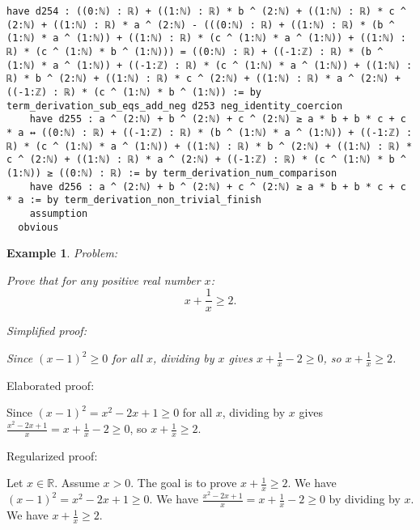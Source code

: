 \documentclass{article}
\newtheorem{example}{Example}
\begin{document}
\begin{tcolorbox}[colback=white!10, width=\linewidth]
\begin{lstlisting}[language=Lean4]
    have d254 : ((0:ℕ) : ℝ) + ((1:ℕ) : ℝ) * b ^ (2:ℕ) + ((1:ℕ) : ℝ) * c ^ (2:ℕ) + ((1:ℕ) : ℝ) * a ^ (2:ℕ) - (((0:ℕ) : ℝ) + ((1:ℕ) : ℝ) * (b ^ (1:ℕ) * a ^ (1:ℕ)) + ((1:ℕ) : ℝ) * (c ^ (1:ℕ) * a ^ (1:ℕ)) + ((1:ℕ) : ℝ) * (c ^ (1:ℕ) * b ^ (1:ℕ))) = ((0:ℕ) : ℝ) + ((-1:ℤ) : ℝ) * (b ^ (1:ℕ) * a ^ (1:ℕ)) + ((-1:ℤ) : ℝ) * (c ^ (1:ℕ) * a ^ (1:ℕ)) + ((1:ℕ) : ℝ) * b ^ (2:ℕ) + ((1:ℕ) : ℝ) * c ^ (2:ℕ) + ((1:ℕ) : ℝ) * a ^ (2:ℕ) + ((-1:ℤ) : ℝ) * (c ^ (1:ℕ) * b ^ (1:ℕ)) := by term_derivation_sub_eqs_add_neg d253 neg_identity_coercion
    have d255 : a ^ (2:ℕ) + b ^ (2:ℕ) + c ^ (2:ℕ) ≥ a * b + b * c + c * a ↔ ((0:ℕ) : ℝ) + ((-1:ℤ) : ℝ) * (b ^ (1:ℕ) * a ^ (1:ℕ)) + ((-1:ℤ) : ℝ) * (c ^ (1:ℕ) * a ^ (1:ℕ)) + ((1:ℕ) : ℝ) * b ^ (2:ℕ) + ((1:ℕ) : ℝ) * c ^ (2:ℕ) + ((1:ℕ) : ℝ) * a ^ (2:ℕ) + ((-1:ℤ) : ℝ) * (c ^ (1:ℕ) * b ^ (1:ℕ)) ≥ ((0:ℕ) : ℝ) := by term_derivation_num_comparison
    have d256 : a ^ (2:ℕ) + b ^ (2:ℕ) + c ^ (2:ℕ) ≥ a * b + b * c + c * a := by term_derivation_non_trivial_finish
    assumption
  obvious

\end{lstlisting}
\end{tcolorbox}


\begin{example}
Problem:
\begin{tcolorbox}[colback=yellow!10, width=\linewidth]
Prove that for any positive real number $x$:
    $$x + \frac{1}{x} \geq 2.$$
\end{tcolorbox}

Simplified proof:
\begin{tcolorbox}[colback=blue!10, width=\linewidth]
Since $(x-1)^2 \ge 0$ for all $x$, dividing by $x$ gives $x + \frac{1}{x} - 2 \ge 0$, so $x + \frac{1}{x} \ge 2$.
\end{tcolorbox}
\end{example}

Elaborated proof:
\begin{tcolorbox}[colback=green!10, width=\linewidth]
Since $(x-1)^2 = x^2 - 2x + 1 \ge 0$ for all $x$, dividing by $x$ gives $\frac{x^2 - 2x + 1}{x} = x + \frac{1}{x} - 2 \ge 0$, so $x + \frac{1}{x} \ge 2$.
\end{tcolorbox}

Regularized proof:
\begin{tcolorbox}[colback=red!10, width=\linewidth]
Let $x\in\mathbb{R}$. Assume $x>0$.
The goal is to prove $x + \frac{1}{x} \ge 2$.
We have ${\left(x-1\right)}^2 = x^2 - 2x + 1 \ge 0$.
We have $\frac{x^2 - 2x + 1}{x} = x + \frac{1}{x} - 2 \ge 0$ by dividing by $x$.
We have $x + \frac{1}{x} \ge 2$.
\end{tcolorbox}
\end{document}
